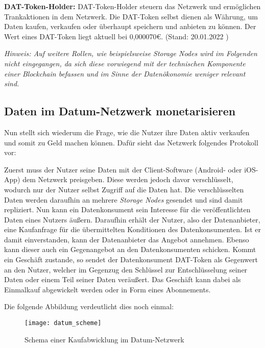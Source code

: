 \noindent \textbf{DAT-Token-Holder:} DAT-Token-Holder steuern das Netzwerk und ermöglichen Trankaktionen in dem Netzwerk. Die DAT-Token selbst dienen als Währung, um Daten kaufen, verkaufen oder überhaupt speichern und anbieten zu können. Der Wert eines DAT-Token liegt aktuell bei 0,000070€. (Stand: 20.01.2022 \cite{DAT_Token_price}) \newline

\noindent \textit{Hinweis: Auf weitere Rollen, wie beispielsweise Storage Nodes wird im Folgenden nicht eingegangen, da sich diese vorwiegend mit der technischen Komponente einer Blockchain befassen und im Sinne der Datenökonomie weniger relevant sind.}

\subsection{Daten im Datum-Netzwerk monetarisieren}
Nun stellt sich wiederum die Frage, wie die Nutzer ihre Daten aktiv verkaufen und somit zu Geld machen können. Dafür sieht das Netzwerk folgendes Protokoll vor:\newline

\noindent Zuerst muss der Nutzer seine Daten mit der Client-Software (Android- oder iOS-App) dem Netzwerk preisgeben. Diese werden jedoch davor verschlüsselt, wodurch nur der Nutzer selbst Zugriff auf die Daten hat. Die verschlüsselten Daten werden daraufhin an mehrere \textit{Storage Nodes} gesendet und sind damit repliziert. Nun kann ein Datenkonsument sein Interesse für die veröffentlichten Daten eines Nutzers äußern. Daraufhin erhält der Nutzer, also der Datenanbieter, eine Kaufanfrage für die übermittelten Konditionen des Datenkonsumenten. Ist er damit einverstanden, kann der Datenanbieter das Angebot annehmen. Ebenso kann dieser auch ein Gegenangebot an den Datenkonsumenten schicken. Kommt ein Geschäft zustande, so sendet der Datenkonsument DAT-Token als Gegenwert an den Nutzer, welcher im Gegenzug den Schlüssel zur Entschlüsselung seiner Daten oder einem Teil seiner Daten veräußert.
Das Geschäft kann dabei als Einmalkauf abgewickelt werden oder in Form eines Abonnements. \cite{datum_2017} \newline

\noindent Die folgende Abbildung verdeutlicht dies noch einmal:

\begin{figure}[!ht]
	\centering
	\texttt{[image: datum\_scheme]}
	\caption{Schema einer Kaufabwicklung im Datum-Netzwerk \cite{datum_2017}}
	\label{fig:datumScheme}
\end{figure}
\FloatBarrier